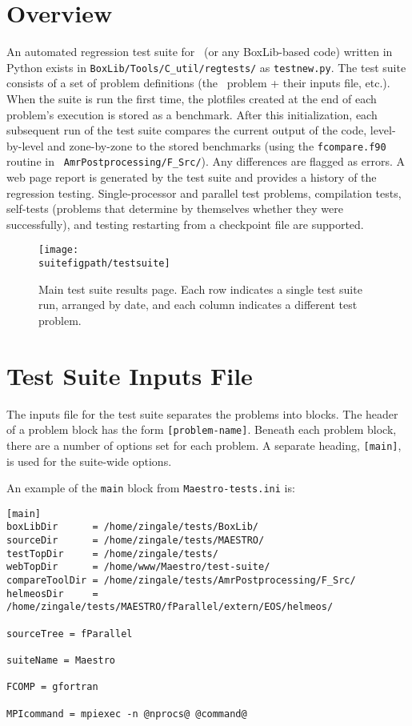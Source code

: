\section{Overview}

An automated regression test suite for \maestro\ (or any BoxLib-based
code) written in Python exists in {\tt BoxLib/Tools/C\_util/regtests/}
as {\tt testnew.py}.  The test suite consists of a set of problem
definitions (the \maestro\ problem + their inputs file, etc.).  When
the suite is run the first time, the plotfiles created at the end of
each problem's execution is stored as a benchmark.  After this
initialization, each subsequent run of the test suite compares the
current output of the code, level-by-level and zone-by-zone to the
stored benchmarks (using the {\tt fcompare.f90} routine in {\tt
  AmrPostprocessing/F\_Src/}).  Any differences are flagged as errors.
A web page report is generated by the test suite and provides a
history of the regression testing.  Single-processor and parallel test
problems, compilation tests, self-tests (problems that determine by
themselves whether they were successfully), and testing restarting
from a checkpoint file are supported.

\begin{figure}[t]
\centering
\texttt{[image: \\suitefigpath/testsuite]}
\caption{\label{fig:test_suite_main} Main test suite results page.  Each 
row indicates a single test suite run, arranged by date, and each column
indicates a different test problem. }
\end{figure}

\section{Test Suite Inputs File}

The inputs file for the test suite separates the problems into blocks.
The header of a problem block has the form {\tt [problem-name]}.
Beneath each problem block, there are a number of options set for each
problem.  A separate heading, {\tt [main]}, is used for the suite-wide
options.

An example of the {\tt main} block from {\tt Maestro-tests.ini} is:
\begin{lstlisting}
[main]
boxLibDir      = /home/zingale/tests/BoxLib/
sourceDir      = /home/zingale/tests/MAESTRO/
testTopDir     = /home/zingale/tests/
webTopDir      = /home/www/Maestro/test-suite/
compareToolDir = /home/zingale/tests/AmrPostprocessing/F_Src/
helmeosDir     = /home/zingale/tests/MAESTRO/fParallel/extern/EOS/helmeos/

sourceTree = fParallel

suiteName = Maestro

FCOMP = gfortran

MPIcommand = mpiexec -n @nprocs@ @command@
\end{lstlisting}

